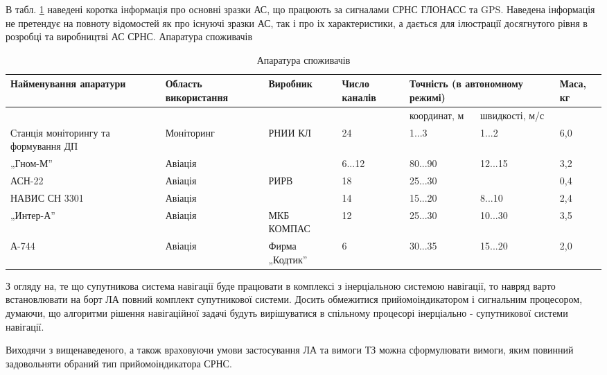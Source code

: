В табл. \ref{tb:ac} наведені коротка інформація про основні зразки АС, що працюють за сигналами 
СРНС ГЛОНАСС та GPS. Наведена інформація не претендує на повноту відомостей як про існуючі 
зразки АС, так і про іх характеристики, а дається для ілюстрації досягнутого рівня 
в розробці та виробництві АС СРНС.
Апаратура споживачів
\begin{table}[here]
\small
\caption{Апаратура споживачів}
\centering
\begin{tabular}{|p{30mm}|p{20mm}|p{20mm}|p{20mm}|p{20mm}|p{20mm}|p{10mm}|} \hline 
Найменування апаратури & Область використання & Виробник & Число каналів & 
\multicolumn{2}{|p{30mm}|}{Точність (в автономному режимі)} & Маса, кг \\ \hline 
 &  &  &  & координат, м & швидкості, м/с &  \\ \hline 
Станція моніторингу та формування ДП & Моніторинг & РНИИ КЛ & 24 & 1...3 & 1...2 & 6,0 \\ \hline 
„Гном-М'' & Авіація &  & 6...12 & 80...90 & 12...15 & 3,2 \\ \hline 
АСН-22 & Авіація & РИРВ & 18 & 25...30 &  & 0,4 \\ \hline 
НАВИС СН 3301 & Авіація &  & 14 & 15...20 & 8...10 & 2,4 \\ \hline 
„Интер-А'' & Авіація & МКБ КОМПАС & 12 & 25...30 & 10...30 & 3,5 \\ \hline 
А-744 & Авіація & Фирма „Кодтик'' & 6 & 30...35 & 15...20 & 2,0 \\ \hline 
\end{tabular}
\label{tb:ac}
\end{table}

З огляду на, те що  супутникова система навігації буде працювати в комплексі з 
інерціальною системою навігації, то навряд варто встановлювати  на борт ЛА повний 
комплект супутникової системи. Досить обмежитися  прийомоіндикатором і сигнальним 
процесором, думаючи, що алгоритми рішення навігаційної задачі будуть вирішуватися 
в спільному процесорі інерціально - супутникової системи навігації. 

Виходячи з вищенаведеного, а також враховуючи умови застосування ЛА та вимоги 
ТЗ можна сформулювати вимоги, яким повинний задовольняти обраний тип прийомоіндикатора 
СРНС. 

